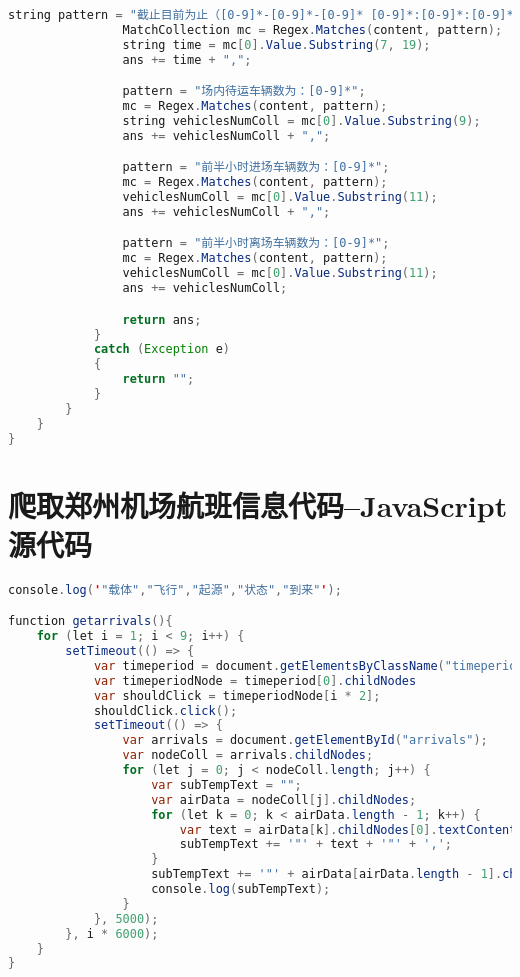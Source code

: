 \documentclass[withoutpreface,bwprint]{cumcmthesis} %
\begin{document}
\begin{appendices}
\begin{lstlisting}[language=java]
                string pattern = "截止目前为止（[0-9]*-[0-9]*-[0-9]* [0-9]*:[0-9]*:[0-9]*）";
                MatchCollection mc = Regex.Matches(content, pattern);
                string time = mc[0].Value.Substring(7, 19);
                ans += time + ",";

                pattern = "场内待运车辆数为：[0-9]*";
                mc = Regex.Matches(content, pattern);
                string vehiclesNumColl = mc[0].Value.Substring(9);
                ans += vehiclesNumColl + ",";

                pattern = "前半小时进场车辆数为：[0-9]*";
                mc = Regex.Matches(content, pattern);
                vehiclesNumColl = mc[0].Value.Substring(11);
                ans += vehiclesNumColl + ",";

                pattern = "前半小时离场车辆数为：[0-9]*";
                mc = Regex.Matches(content, pattern);
                vehiclesNumColl = mc[0].Value.Substring(11);
                ans += vehiclesNumColl;

                return ans;
            }
            catch (Exception e)
            {
                return "";
            }
        }
    }
}

\end{lstlisting}

	\section{爬取郑州机场航班信息代码--JavaScript 源代码}
	\begin{lstlisting}[language=java]
console.log('"载体","飞行","起源","状态","到来"');

function getarrivals(){
    for (let i = 1; i < 9; i++) {
        setTimeout(() => {
            var timeperiod = document.getElementsByClassName("timeperiod");
            var timeperiodNode = timeperiod[0].childNodes
            var shouldClick = timeperiodNode[i * 2];
            shouldClick.click();
            setTimeout(() => {
                var arrivals = document.getElementById("arrivals");
                var nodeColl = arrivals.childNodes;
                for (let j = 0; j < nodeColl.length; j++) {
                    var subTempText = "";
                    var airData = nodeColl[j].childNodes;
                    for (let k = 0; k < airData.length - 1; k++) {
                        var text = airData[k].childNodes[0].textContent;
                        subTempText += '"' + text + '"' + ',';
                    }
                    subTempText += '"' + airData[airData.length - 1].childNodes[0].textContent + '"';
                    console.log(subTempText);
                }
            }, 5000);
        }, i * 6000);
    }    
}


\end{lstlisting}
\end{appendices}
\end{document}
